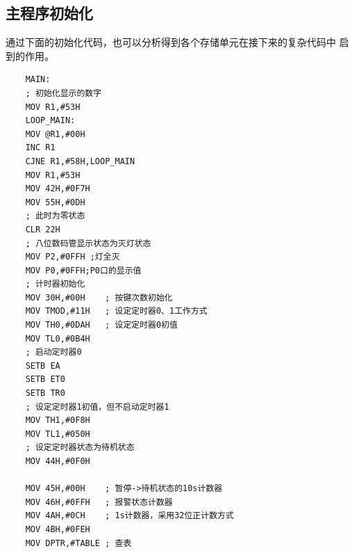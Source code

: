 \documentclass{article}
\begin{document}
\subsection{主程序初始化}
通过下面的初始化代码，也可以分析得到各个存储单元在接下来的复杂代码中
启到的作用。
\begin{multicols}{3}
\begin{lstlisting}
    MAIN:
    ; 初始化显示的数字
    MOV R1,#53H
    LOOP_MAIN:
    MOV @R1,#00H
    INC R1
    CJNE R1,#58H,LOOP_MAIN
    MOV R1,#53H
    MOV 42H,#0F7H
    MOV 55H,#0DH
    ; 此时为零状态
    CLR 22H
    ; 八位数码管显示状态为灭灯状态
    MOV P2,#0FFH ;灯全灭
    MOV P0,#0FFH;P0口的显示值
    ; 计时器初始化
    MOV 30H,#00H    ; 按键次数初始化
    MOV TMOD,#11H   ; 设定定时器0、1工作方式
    MOV TH0,#0DAH   ; 设定定时器0初值
    MOV TL0,#0B4H
    ; 启动定时器0
    SETB EA     
    SETB ET0
    SETB TR0
    ; 设定定时器1初值，但不启动定时器1
    MOV TH1,#0F8H
    MOV TL1,#050H
    ; 设定定时器状态为待机状态
    MOV 44H,#0F0H

    MOV 45H,#00H    ; 暂停->待机状态的10s计数器
    MOV 46H,#0FFH   ; 报警状态计数器
    MOV 4AH,#0CH    ; 1s计数器，采用32位正计数方式
    MOV 4BH,#0FEH   
    MOV DPTR,#TABLE ; 查表
\end{lstlisting}
\end{multicols}
\end{document}
